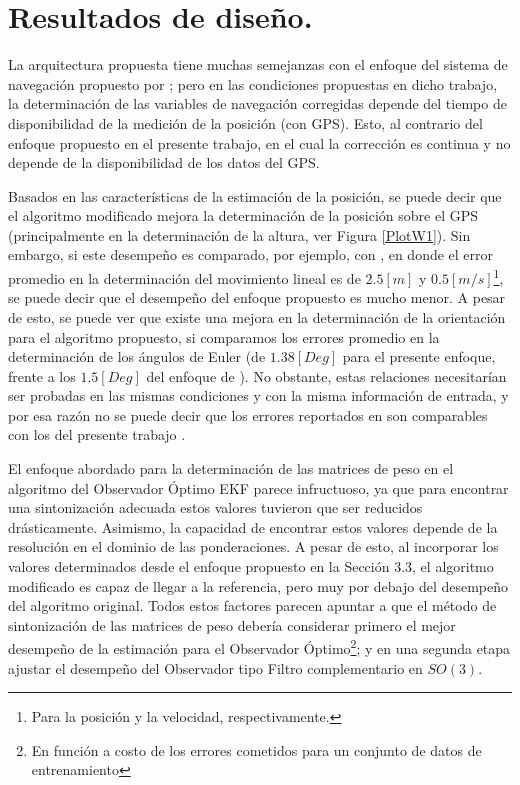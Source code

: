 \documentclass[conference]{IEEEtran}
\begin{document}
\section{Resultados de diseño.}
La arquitectura propuesta tiene muchas semejanzas con el enfoque del sistema de navegación propuesto por \cite{Kong2004}; pero en las condiciones propuestas en dicho trabajo, la determinación de las variables de navegación corregidas depende del tiempo de disponibilidad de la medición de la posición (con GPS). Esto, al contrario del enfoque propuesto en el presente trabajo, en el cual la corrección es continua y no depende de la disponibilidad de los datos del GPS.\par
Basados en las características de la estimación de la posición, se puede decir que el algoritmo modificado mejora la determinación de la posición sobre el GPS (principalmente en la determinación de la altura, ver Figura \ref{PlotW1}). Sin embargo, si este desempeño es comparado, por ejemplo, con \cite{Cai2011}, en donde el error promedio en la determinación del movimiento lineal es de $2.5 [m]$ y $0.5 [m/s]$\footnote{Para la posición y la velocidad, respectivamente.}, se puede decir que el desempeño del enfoque propuesto es mucho menor. A pesar de esto, se puede ver que existe una mejora en la determinación de la orientación para el algoritmo propuesto, si comparamos los errores promedio en la determinación de los ángulos de Euler (de $1.38[Deg]$ para el presente enfoque, frente a los $1.5[Deg]$ del enfoque de \cite{Cai2011}). No obstante, estas relaciones necesitarían ser probadas en las mismas condiciones y con la misma información de entrada, y por esa razón no se puede decir que los errores reportados en \cite{Cai2011} son comparables con los del presente trabajo .\par
El enfoque abordado para la determinación de las matrices de peso en el algoritmo del Observador Óptimo EKF parece infructuoso, ya que para encontrar una sintonización adecuada estos valores tuvieron que ser reducidos drásticamente. Asimismo, la capacidad de encontrar estos valores depende de la resolución en el dominio de las ponderaciones. A pesar de esto, al incorporar los valores determinados desde el enfoque propuesto en la Sección 3.3, el algoritmo modificado es capaz de llegar a la referencia, pero muy por debajo del desempeño del algoritmo original. Todos estos factores parecen apuntar a que el método de sintonización de las matrices de peso debería considerar primero el mejor desempeño de la estimación para el Observador Óptimo\footnote{En función a costo de los errores cometidos para un conjunto de datos de entrenamiento}; y en una segunda etapa ajustar el desempeño del Observador tipo Filtro complementario en $SO(3)$. \par
\end{document}
